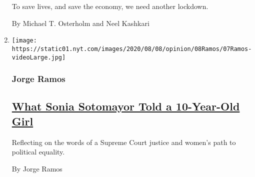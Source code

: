 \begin{enumerate}
  To save lives, and save the economy, we need another lockdown.

  By Michael T. Osterholm and Neel Kashkari
\item
  \texttt{[image: https://static01.nyt.com/images/2020/08/08/opinion/08Ramos/07Ramos-videoLarge.jpg]}

  \hypertarget{jorge-ramos}{%
  \subsubsection{Jorge Ramos}\label{jorge-ramos}}

  \hypertarget{what-sonia-sotomayor-told-a-10-year-old-girl}{%
  \subsection{\texorpdfstring{\href{/2020/08/07/opinion/latina-women-politics.html}{What
  Sonia Sotomayor Told a 10-Year-Old
  Girl}}{What Sonia Sotomayor Told a 10-Year-Old Girl}}\label{what-sonia-sotomayor-told-a-10-year-old-girl}}

  Reflecting on the words of a Supreme Court justice and women's path to
  political equality.

  By Jorge Ramos
\end{enumerate}

